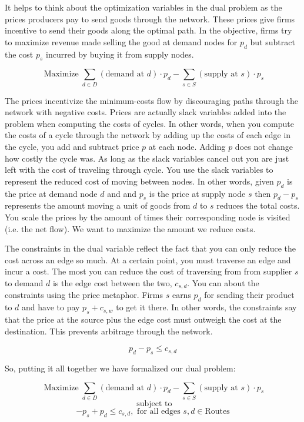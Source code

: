 \documentclass{report}
\begin{document}
It helps to think about the optimization variables in the dual problem as the prices producers pay to send goods through the network. These prices give firms incentive to send their goods along the optimal path. In the objective, firms try to maximize revenue made selling the good at demand nodes for $p_d$ but subtract the cost $p_s$ incurred by buying it from supply nodes.  

$$\operatorname{Maximize} \sum_{d \in D}  (\text{demand at } d) \cdot p_{d} -   \sum_{s \in S}  (\text{supply at } s) \cdot p_{s} $$

The prices incentivize the minimum-costs flow by discouraging paths through the network with negative costs. Prices are actually slack variables added into the problem when computing the costs of cycles. In other words, when you compute the costs of a cycle through the network by adding up the costs of each edge in the cycle, you add and subtract price $p$ at each node. Adding $p$ does not change how costly the cycle was. As long as the slack variables cancel out you are just left with the cost of traveling through cycle. You use the slack variables to represent the reduced cost of moving between nodes. In other words, given $p_d$ is the price at demand node $d$ and and $p_s$ is the price at supply node $s$ then $p_d - p_s$ represents the amount moving a unit of goods from $d$ to $s$ reduces the total costs. You scale the prices by the amount of times their corresponding node is visited (i.e. the net flow). We want to maximize the amount we reduce costs. 

The constraints in the dual variable reflect the fact that you can only reduce the cost across an edge so much. At a certain point, you must traverse an edge and incur a cost. The most you can reduce the cost of traversing from from supplier $s$ to demand $d$ is the edge cost between the two, $c_{s,d}$. You can about the constraints using the price metaphor. Firms $s$ earns $p_d$ for sending their product to $d$ and have to pay $p_s + c_{s,w}$ to get it there. In other words, the constraints say that the price at the source plus the edge cost must outweigh the cost at the destination. This prevents arbitrage through the network.

$$ p_d -p_s  \leq c_{s,d}$$

So, putting it all together we have formalized our dual problem:

$$\operatorname{Maximize} \sum_{d \in D}  (\text{demand at } d) \cdot p_{d} -   \sum_{s \in S}  (\text{supply at } s) \cdot p_{s} $$
$$ \text{ subject to}$$
$$ -p_s + p_d \leq c_{s,d},  \text{ for all edges }  s,d\in \textrm{Routes}$$
\end{document}
